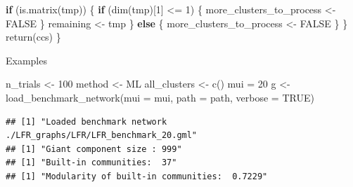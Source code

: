 \documentclass[
]{article}
\newenvironment{Shaded}{\begin{snugshade}}{\end{snugshade}}
\newcommand{\AttributeTok}[1]{\textcolor[rgb]{0.77,0.63,0.00}{#1}}
\newcommand{\CommentTok}[1]{\textcolor[rgb]{0.56,0.35,0.01}{\textit{#1}}}
\newcommand{\ConstantTok}[1]{\textcolor[rgb]{0.00,0.00,0.00}{#1}}
\newcommand{\ControlFlowTok}[1]{\textcolor[rgb]{0.13,0.29,0.53}{\textbf{#1}}}
\newcommand{\DecValTok}[1]{\textcolor[rgb]{0.00,0.00,0.81}{#1}}
\newcommand{\FunctionTok}[1]{\textcolor[rgb]{0.00,0.00,0.00}{#1}}
\newcommand{\NormalTok}[1]{#1}
\newcommand{\OtherTok}[1]{\textcolor[rgb]{0.56,0.35,0.01}{#1}}
\newcommand{\SpecialCharTok}[1]{\textcolor[rgb]{0.00,0.00,0.00}{#1}}
\newcommand{\StringTok}[1]{\textcolor[rgb]{0.31,0.60,0.02}{#1}}
\begin{document}
\begin{Shaded}
\begin{Highlighting}[]
      \ControlFlowTok{if}\NormalTok{ (}\FunctionTok{is.matrix}\NormalTok{(tmp)) \{}
        \ControlFlowTok{if}\NormalTok{ (}\FunctionTok{dim}\NormalTok{(tmp)[}\DecValTok{1}\NormalTok{] }\SpecialCharTok{\textless{}=} \DecValTok{1}\NormalTok{) \{}
\NormalTok{          more\_clusters\_to\_process }\OtherTok{\textless{}{-}} \ConstantTok{FALSE}
\NormalTok{        \}}
\NormalTok{        remaining }\OtherTok{\textless{}{-}}\NormalTok{ tmp}
\NormalTok{      \} }\ControlFlowTok{else}\NormalTok{ \{}
\NormalTok{        more\_clusters\_to\_process }\OtherTok{\textless{}{-}} \ConstantTok{FALSE}
\NormalTok{      \}}
\NormalTok{    \}}
    \FunctionTok{return}\NormalTok{(ccs)}
\NormalTok{  \}}
\end{Highlighting}
\end{Shaded}

\newpage

Examples

\begin{Shaded}
\begin{Highlighting}[]
\NormalTok{n\_trials }\OtherTok{\textless{}{-}} \DecValTok{100}
\NormalTok{method }\OtherTok{\textless{}{-}} \StringTok{\textquotesingle{}ML\textquotesingle{}}
\NormalTok{all\_clusters }\OtherTok{\textless{}{-}} \FunctionTok{c}\NormalTok{()}
\NormalTok{mui }\OtherTok{=} \DecValTok{20}
\NormalTok{g }\OtherTok{\textless{}{-}} \FunctionTok{load\_benchmark\_network}\NormalTok{(}\AttributeTok{mui =}\NormalTok{ mui, }\AttributeTok{path =}\NormalTok{ path, }\AttributeTok{verbose =} \ConstantTok{TRUE}\NormalTok{)}
\end{Highlighting}
\end{Shaded}

\begin{verbatim}
## [1] "Loaded benchmark network ./LFR_graphs/LFR/LFR_benchmark_20.gml"
## [1] "Giant component size : 999"
## [1] "Built-in communities:  37"
## [1] "Modularity of built-in communities:  0.7229"
\end{verbatim}

\begin{Shaded}
\end{Shaded}
\end{document}
